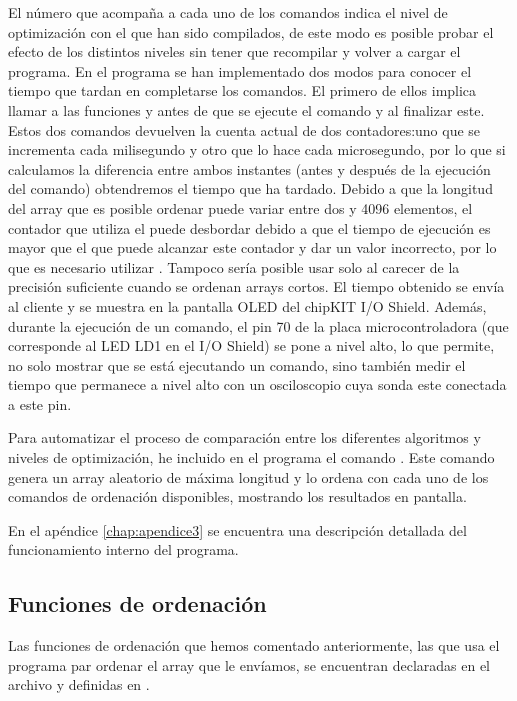 El número que acompaña a cada uno de los comandos indica el nivel de optimización con el que han sido compilados, de este modo es posible probar el efecto de los distintos niveles sin tener que recompilar y volver a cargar el programa. En el programa se han implementado dos modos para conocer el tiempo que tardan en completarse los comandos. El primero de ellos implica llamar a las funciones  y  antes de que se ejecute el comando y al finalizar este. Estos dos comandos devuelven la cuenta actual de dos contadores:uno que se incrementa cada milisegundo y otro que lo hace cada microsegundo, por lo que si calculamos la diferencia entre ambos instantes (antes y después de la ejecución del comando) obtendremos el tiempo que ha tardado. Debido a que la longitud del array que es posible ordenar puede variar entre dos y 4096 elementos, el contador que utiliza el  puede desbordar debido a que el tiempo de ejecución es mayor que el que puede alcanzar este contador y dar un valor incorrecto, por lo que es necesario utilizar . Tampoco sería posible usar solo  al carecer de la precisión suficiente cuando se ordenan arrays cortos. El tiempo obtenido se envía al cliente y se muestra en la pantalla OLED del chipKIT I/O Shield. Además, durante la ejecución de un comando, el pin 70 de la placa microcontroladora (que corresponde al LED LD1 en el I/O Shield) se pone a nivel alto, lo que permite, no solo mostrar que se está ejecutando un comando, sino también medir el tiempo que permanece a nivel alto con un osciloscopio cuya sonda este conectada a este pin. 

Para automatizar el proceso de comparación entre los diferentes algoritmos y niveles de optimización, he incluido en el programa el comando . Este comando genera un array aleatorio de máxima longitud y lo ordena con cada uno de los comandos de ordenación disponibles, mostrando los resultados en pantalla.

En el apéndice \ref{chap:apendice3} se encuentra una descripción detallada del funcionamiento interno del programa.

\subsection{Funciones de ordenación}
Las funciones de ordenación que hemos comentado anteriormente, las que usa el programa par ordenar el array que le envíamos, se encuentran declaradas en el archivo  y definidas en .

